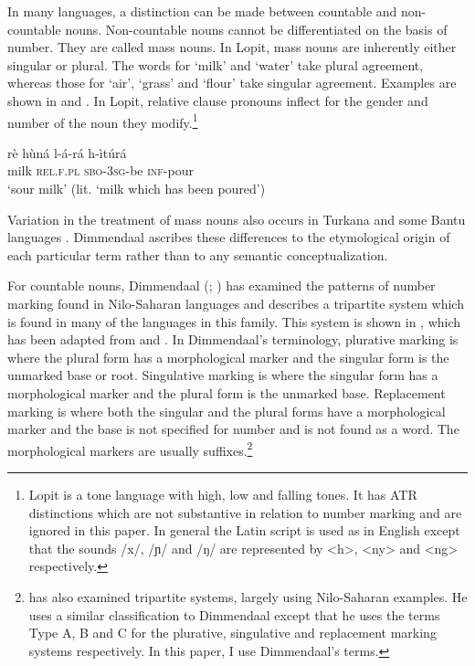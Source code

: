 \documentclass[output=paper]{langsci/langscibook}
\begin{document}
In many languages, a distinction can be made between countable and non-countable nouns. Non-countable nouns cannot be differentiated on the basis of number. They are called mass nouns. In Lopit, mass nouns are inherently either singular or plural.  The words for ‘milk’ and ‘water’ take plural agreement, whereas those for ‘air’, ‘grass’ and ‘flour’ take singular agreement. Examples are shown in  and . In Lopit, relative clause pronouns inflect for the gender and number of the noun they modify.\footnote{Lopit is a tone language with high, low and falling tones. It has ATR distinctions which are not substantive in relation to number marking and are ignored in this paper. In general the Latin script is used as in English except that the sounds /x/, /ɲ/ and /ŋ/ are represented by <h>, <ny> and <ng> respectively.}

\ea\label{ex:moodie:1}
\gll rè hùná l-á-rá h-ìtúrá \\
milk \textsc{rel.f.pl} \textsc{sbo-3sg}-be \textsc{inf}-pour \\
\glt ‘sour milk’ (lit. ‘milk which has been poured’)
\z

\ea\label{ex:moodie:2}

\z
\z

Variation in the treatment of mass nouns also occurs in Turkana \citep[224]{Dimmendaal1983} and some Bantu languages \citep[173]{Corbett2000}. Dimmendaal ascribes these differences to the etymological origin of each particular term \citep[230]{Dimmendaal2000} rather than to any semantic conceptualization.

For countable nouns, Dimmendaal (\citeyear[224]{Dimmendaal1983}; \citeyear[214]{Dimmendaal2000}) has examined the patterns of number marking found in Nilo-Saharan languages and describes a tripartite system which is found in many of the languages in this family. This system is shown in , which has been adapted from \citet[224]{Dimmendaal1983} and \citet[156]{Corbett2000}. In Dimmendaal’s terminology, plurative marking is where the plural form has a morphological marker and the singular form is the unmarked base or root. Singulative marking is where the singular form has a morphological marker and the plural form is the unmarked base. Replacement marking is where both the singular and the plural forms have a morphological marker and the base is not specified for number and is not found as a word. The morphological markers are usually suffixes.\footnote{\citet[156]{Corbett2000} has also examined tripartite systems, largely using Nilo-Saharan examples. He uses a similar classification to Dimmendaal except that he uses the terms Type A, B and C for the plurative, singulative and replacement marking systems respectively. In this paper, I use Dimmendaal’s terms.}
\end{document}
